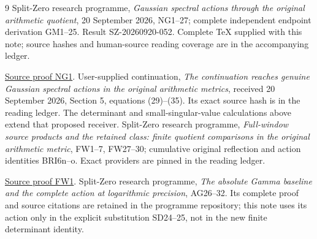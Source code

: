 \documentclass[11pt]{article}
\begin{document}
\begin{thebibliography}{9}
 Split-Zero research programme, \emph{Gaussian spectral
actions through the original arithmetic quotient}, 20 September 2026,
NG1--27; complete independent endpoint derivation GM1--25. Result
SZ-20260920-052. Complete TeX supplied with this note; source hashes and
human-source reading coverage are in the accompanying ledger.

\href{https://github.com/KokunoYumeto/zeta-function-research-reader/blob/5992ad50c0f2a06921f1fcaded7b4e38097c0739/workbenches/splitzero-tandem/continuations/20260920-original-kernel-mixed-determinants/providers/GAUSSIAN_ARITHMETIC_RETURN.tex\#L31}{Source proof NG1}.
 User-supplied continuation, \emph{The continuation
reaches genuine Gaussian spectral actions in the original arithmetic
metrics}, received 20 September 2026, Section 5, equations (29)--(35).
Its exact source hash is in the reading ledger. The determinant and
small-singular-value calculations above extend that proposed receiver.
 Split-Zero research programme, \emph{Full-window source
products and the retained class: finite quotient comparisons in the
original arithmetic metric}, FW1--7, FW27--30; cumulative original
reflection and action identities BRI6n--o. Exact providers are pinned
in the reading ledger.

\href{https://github.com/KokunoYumeto/zeta-function-research-reader/blob/5992ad50c0f2a06921f1fcaded7b4e38097c0739/workbenches/splitzero-tandem/continuations/20260920-original-kernel-mixed-determinants/providers/FULL_WINDOW_SOURCE_PRODUCTS.tex\#L28}{Source proof FW1}.
 Split-Zero research programme, \emph{The absolute Gamma
baseline and the complete action at logarithmic precision}, AG26--32.
Its complete proof and source citations are retained in the programme
repository; this note uses its action only in the explicit substitution
SD24--25, not in the new finite determinant identity.


\end{thebibliography}
\end{document}
